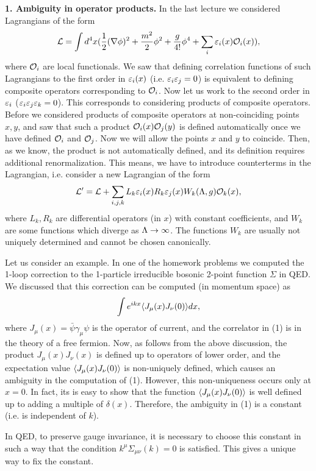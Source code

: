 \documentclass[11pt]{article}
\begin{document}
{\bf 1. Ambiguity in operator products.} 
In the last lecture we considered Lagrangians of the form
$$
{\cal L}=\int d^4x(\frac{1}{2}(\nabla \phi)^2+\frac{m^2}{2}\phi^2+
\frac{g}{4!}\phi^4+\sum_i\varepsilon_i(x){\cal O}_i(x)),
$$
where ${\cal O}_i$ are local functionals. 
We saw that defining correlation functions of such Lagrangians 
to the first order in $\varepsilon_i(x)$ (i.e. $\varepsilon_i\varepsilon_j=0$) is equivalent
to defining composite operators corresponding to ${\cal O}_i$.  
Now let us work to the second order in $\varepsilon_i$ ($\varepsilon_i\varepsilon_j\varepsilon_k=0$).
This corresponds to considering products of composite operators. 
Before we considered products of composite operators at non-coinciding 
points $x,y$, and saw that such a product ${\cal O}_i(x){\cal O}_j(y)$ is
defined automatically once we have defined ${\cal O}_i$ and ${\cal O}_j$.
Now we will allow the points $x$ and $y$ to coincide. 
Then, as we know, the product is not automatically defined, and 
its definition requires additional renormalization. 
This means, we have to introduce counterterms in the Lagrangian,
i.e. consider a new Lagrangian of the form 
$$
{\cal L}'={\cal L}+\sum_{i,j,k} 
L_k\varepsilon_i(x)R_k\varepsilon_j(x)W_k(\Lambda,g){\cal O}_k(x),
$$
where $L_k,R_k$ are differential operators (in $x$) with constant
coefficients, and $W_k$ are some functions which diverge as $\Lambda\to\infty$. 
The functions $W_k$ are usually not uniquely determined and
cannot be chosen canonically. 
 
Let us consider an example. In one of the homework problems 
we computed the 1-loop correction to the 1-particle 
irreducible bosonic 2-point 
function $\Sigma$ in QED. We discussed that this correction 
can be computed (in momentum space) as 
$$
\int e^{ikx}\<J_\mu(x)J_\nu(0)\>dx,\label 1
$$
where $J_\mu(x)=\bar\psi\gamma_\mu\psi$ is the operator of current, and 
the correlator in (1) is in the theory of a free fermion. 
Now, as follows from the above discussion, 
the product $J_\mu(x)J_\nu(x)$ is defined up to operators 
of lower order, and 
the expectation value $\langle J_\mu(x)J_\nu(0)\rangle$ is 
non-uniquely defined, which causes an ambiguity in 
the computation of (1). However, this non-uniqueness occurs
only at $x=0$. In fact, its is easy to show
that the function $\langle J_\mu(x)J_\nu(0)\rangle$ 
is well defined up to adding a multiple of $\delta(x)$.  
Therefore, the ambiguity in (1) is a constant (i.e. is independent of $k$).

In QED, to preserve gauge invariance, it is necessary to choose this 
constant in such a way that the condition $k^\mu\Sigma_{\mu\nu}(k)=0$ 
is satisfied. 
This gives a unique way to fix the constant. 
\end{document}
